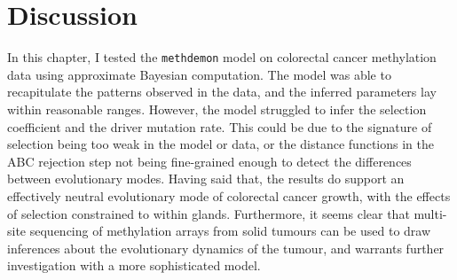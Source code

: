 \section{Discussion}

In this chapter, I tested the \texttt{methdemon} model on colorectal cancer
methylation data using approximate Bayesian computation. The model was able to
recapitulate the patterns observed in the data, and the inferred parameters lay
within reasonable ranges. However, the model struggled to infer the selection
coefficient and the driver mutation rate. This could be due to the signature of
selection being too weak in the model or data, or the distance functions in the
ABC rejection step not being fine-grained enough to detect the differences
between evolutionary modes. Having said that, the results do support an
effectively neutral evolutionary mode of colorectal cancer growth, with the
effects of selection constrained to within glands. Furthermore, it seems clear
that multi-site sequencing of methylation arrays from solid tumours can be used
to draw inferences about the evolutionary dynamics of the tumour, and warrants
further investigation with a more sophisticated model.




